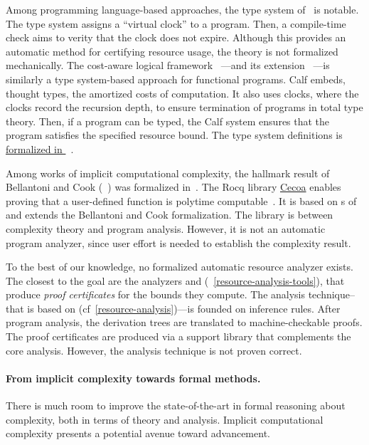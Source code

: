 Among programming language-based approaches, the type system of~\cite{crary2000}
is notable. The type system assigns a \enquote{virtual clock} to a program.
Then, a compile-time check aims to verity that the clock does not expire.
Although this provides an automatic method for certifying resource usage, the
theory is not formalized mechanically. The cost-aware logical framework
~\cite{niu2022}---and its extension
~\cite{grodin2024}---is similarly a type system-based approach for
functional programs. Calf embeds, thought types, the amortized
costs of computation. It also uses clocks, where the clocks
record the recursion depth, to ensure termination of programs in total type
theory. Then, if a program can be typed, the Calf system ensures that the
program satisfies the specified resource bound. The type system definitions is
\href{https://github.com/HarrisonGrodin/agda-calf}{formalized in
}~\cite{grodin2023}.

Among works of implicit computational complexity, the hallmark result of
Bellantoni and Cook (~) was formalized
in~\textcite{heraud2011}. The Rocq library
\href{https://github.com/davidnowak/cecoa}{Cecoa}{} enables proving
that a user-defined function is polytime computable~\cite{feree2018}. It is
based on s of~\textcite{marion2000} and extends the
Bellantoni and Cook formalization. The  library is between complexity
theory and program analysis. However, it is not an automatic program analyzer,
since user effort is needed to establish the complexity result.

To the best of our knowledge, no formalized automatic resource analyzer exists.
The closest to the goal are the analyzers  and 
(\cf~\autoref{resource-analysis-tools}), that produce \emph{proof certificates}
for the bounds they compute. The analysis technique--that is based on
(cf~\autoref{resource-analysis})---is founded on inference rules. After program
analysis, the derivation trees are translated to machine-checkable proofs. The
proof certificates are produced via a support library that complements the core
analysis. However, the analysis {technique} is not proven correct.

\paragraph*{From implicit complexity towards formal methods.}
There is much room to improve the state-of-the-art in formal reasoning about
complexity, both in terms of theory and analysis. Implicit computational
complexity presents a potential avenue toward advancement.

